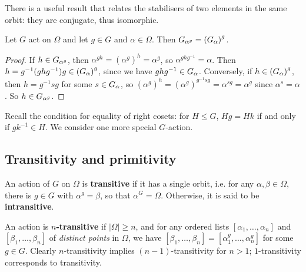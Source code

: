 There is a useful result that relates the stabilisers of two elements in the same orbit: they are conjugate, thus isomorphic.

\begin{proposition}\label{prop:stabilisers_are_conjugate}
    Let $G$ act on $\Omega$ and let $g \in G$ and $\alpha \in \Omega$. Then $\added{2}{G_{\alpha^g}} = \added{2}{(G_\alpha)}^g$.
\end{proposition}

\begin{proof}
    If $h \in \added{2}{G_{\alpha^g}}$, then $\alpha^{gh} = (\alpha^g)^h = \alpha^g$, so $\alpha^{ghg^{-1}} = \alpha$. Then $h = g^{-1}(ghg^{-1})g \in \added{2}{(G_\alpha)}^g$, since we have $ghg^{-1} \in \added{2}{G_\alpha}$. Conversely, if $h \in \added{2}{(G_\alpha)}^g$, then $h = g^{-1}sg$ for some $s \in \added{2}{G_\alpha}$, so $(\alpha^g)^h = (\alpha^g)^{g^{-1}sg} = \alpha^{sg} = \alpha^g$ since $\alpha^s = \alpha$. So $h \in \added{2}{G_{\alpha^g}}$.
\end{proof}

Recall the condition for equality of right cosets: for $H \leq G$, $Hg = Hk$ if and only if $gk^{-1} \in H$. We consider one more special $G$-action.


\subsection{Transitivity and primitivity}

\begin{definition}\label{def:transitive_action}
    An action of $G$ on $\Omega$ is \textbf{transitive} if it has a single orbit, i.e. for any $\alpha,\beta \in \Omega$, there is $g \in G$ with $\alpha^g = \beta$, so that $\alpha^G = \Omega$. Otherwise, it is said to be \textbf{intransitive}.

    An action is \textbf{$n$-transitive} if $|\Omega| \geq n$, and for any ordered lists $[\alpha_1,\dotsc,\alpha_n]$ and $[\beta_1,\dotsc,\beta_n]$ of \textit{distinct points} in $\Omega$, we have $[\beta_1,\dotsc,\beta_n] = [\alpha_1^g,\dotsc,\alpha_n^g]$ for some $g \in G$. Clearly $n$-transitivity implies $(n - 1)$-transitivity for $n > 1$; $1$-transitivity corresponds to transitivity.
\end{definition}

